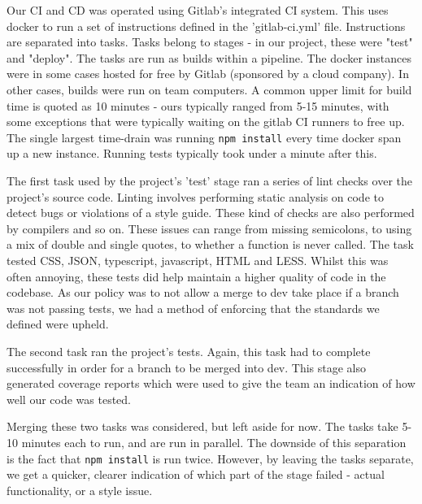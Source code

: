 \documentclass{l3proj}
\begin{document}
Our CI and CD was operated using Gitlab's integrated CI system. This uses docker to
 run a set of instructions defined in the 'gitlab-ci.yml' file.  Instructions are
 separated into tasks. Tasks belong to stages - in our project, these were
 "test" and "deploy". The tasks are run as builds within a pipeline. The docker instances were
 in some cases hosted for free by Gitlab (sponsored by a cloud company). In other cases,
 builds were run on team computers. A common upper limit for build time is quoted as
 10 minutes\cite{fowler2006continuous} - ours typically ranged from 5-15 minutes, with some exceptions that were
 typically waiting on the gitlab CI runners to free up. The single largest time-drain was
 running \texttt{npm install} every time docker span up a new instance. Running tests typically took under
 a minute after this.

 


The first task used by the project's 'test' stage ran a series of lint checks over the
 project's source code. Linting involves performing static analysis on code to detect bugs
 or violations of a style guide. These kind of checks are also performed by compilers and
 so on. These issues can range from missing semicolons, to using a mix of
 double and single quotes, to whether a function is never called. The task tested CSS,
 JSON, typescript, javascript,  HTML and LESS. Whilst this was often annoying, these tests
 did help maintain a higher quality of code in the codebase. As our policy was to not allow a
 merge to dev take place if a branch was not passing tests, we had a method of
 enforcing that the standards we defined were upheld.

The second task ran the project's tests. Again, this task had to complete successfully in
 order for a branch to be merged into dev. This stage also generated coverage reports which
 were used to give the team an indication of how well our code was tested.

 

Merging these two tasks was considered, but left aside for now. The tasks take 5-10 minutes
 each to run, and are run in parallel. The downside of this separation is the fact that \texttt{npm install}
 is run twice. However, by leaving the tasks separate, we get a quicker, clearer indication
 of which part of the stage failed - actual functionality, or a style issue.
\end{document}
